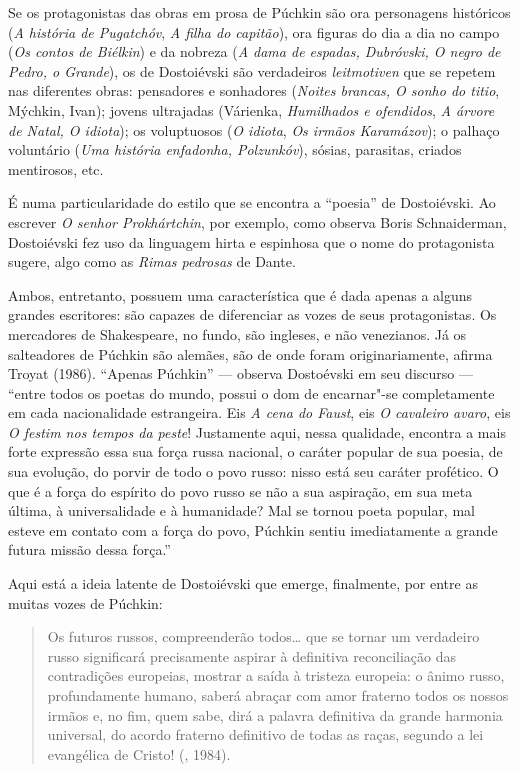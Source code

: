 Se os protagonistas das obras em prosa de Púchkin são ora personagens
históricos (\emph{A história de Pugatchóv}, \emph{A filha do capitão}),
ora figuras do dia a dia no campo (\emph{Os contos de Biélkin}) e da
nobreza (\emph{A dama de espadas, Dubróvski, O negro de Pedro, o
Grande}), os de Dostoiévski são verdadeiros \emph{leitmotiven}
que se repetem nas diferentes obras: pensadores e sonhadores
(\emph{Noites brancas, O sonho do titio}, Mýchkin, Ivan); jovens ultrajadas (Várienka, \emph{Humilhados e ofendidos}, \emph{A árvore de Natal, O idiota}); os voluptuosos (\emph{O idiota}, \emph{Os irmãos Karamázov}); o palhaço
voluntário (\emph{Uma história enfadonha, Polzunkóv}), sósias,
parasitas, criados mentirosos, etc.

É numa particularidade do estilo que se encontra a ``poesia'' de Dostoiévski. Ao escrever \emph{O senhor Prokhártchin}, por exemplo, como observa Boris Schnaiderman, Dostoiévski fez uso da linguagem hirta e espinhosa que o nome do protagonista sugere, algo como as \emph{Rimas pedrosas} de Dante.

Ambos, entretanto, possuem uma característica que é dada apenas
a alguns grandes escritores: são capazes de diferenciar as vozes
de seus protagonistas. Os mercadores de Shakespeare, no fundo,
são ingleses, e não venezianos. Já os salteadores de Púchkin são
alemães, são de onde foram originariamente, afirma Troyat (1986).
``Apenas Púchkin'' --- observa Dostoévski em seu discurso ---
``entre todos os poetas do mundo, possui o dom de encarnar"-se
completamente em cada nacionalidade estrangeira. Eis \emph{A
cena do Faust}, eis \emph{O cavaleiro avaro}, eis \emph{O festim
nos tempos da peste}! Justamente aqui, nessa qualidade, encontra
a mais forte expressão essa sua força russa nacional, o caráter
popular de sua poesia, de sua evolução, do porvir de todo o povo
russo: nisso está seu caráter profético. O que é a força do espírito do povo russo se não a sua aspiração, em sua meta última, à universalidade e à humanidade? Mal se tornou poeta popular, mal esteve em contato com a força do povo, Púchkin sentiu imediatamente a grande futura missão dessa força.''

Aqui está a ideia latente de Dostoiévski que emerge, finalmente, por
entre as muitas vozes de Púchkin:

\begin{quotation}
Os futuros russos, compreenderão todos\ldots{} que se tornar um verdadeiro russo significará precisamente aspirar à definitiva reconciliação das contradições europeias, mostrar a saída à tristeza europeia: o ânimo russo, profundamente humano, saberá abraçar com amor fraterno todos os nossos irmãos e, no fim, quem sabe, dirá a palavra definitiva da grande harmonia universal, do acordo fraterno definitivo de todas as raças, segundo a lei evangélica de Cristo! (, 1984).
\end{quotation}

